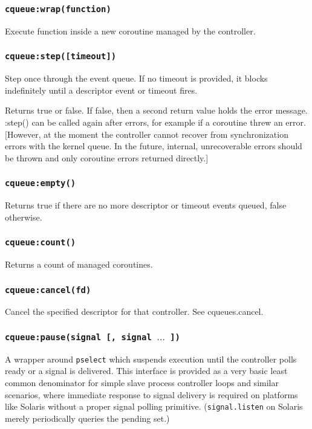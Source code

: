 \documentclass[11pt, oneside]{memoir}
\newcommand*{\syscall}[1]{\texttt{#1}\xspace}
\newcommand*{\routine}[1]{\texttt{#1}\xspace}
\begin{document}
\subsubsection[\routine{cqueues:wrap}]{\routine{cqueue:wrap(function)}}
        Execute function inside a new coroutine managed by the controller.

\subsubsection[\routine{cqueues:step}]{\routine{cqueue:step([timeout])}}
Step once through the event queue. If no timeout is provided, it blocks indefinitely until a descriptor event or timeout fires.

Returns true or false. If false, then a second return value holds the error message. :step() can be called again after errors, for example if a coroutine threw an error. [However, at the moment the controller cannot recover from synchronization errors with the kernel queue. In the future, internal, unrecoverable errors should be thrown and only coroutine errors returned directly.]

\subsubsection[\routine{cqueues:empty}]{\routine{cqueue:empty()}}
Returns true if there are no more descriptor or timeout events queued, false otherwise.

\subsubsection[\routine{cqueues:count}]{\routine{cqueue:count()}}
Returns a count of managed coroutines.

\subsubsection[\routine{cqueues:cancel}]{\routine{cqueue:cancel(fd)}}
Cancel the specified descriptor for that controller. See cqueues.cancel.

\subsubsection[\routine{cqueues:pause}]{\routine{cqueue:pause(signal [, signal $\ldots$ ])}}
A wrapper around \syscall{pselect} which suspends execution until the controller polls ready or a signal is delivered. This interface is provided as a very basic least common denominator for simple slave process controller loops and similar scenarios, where immediate response to signal delivery is required on platforms like Solaris without a proper signal polling primitive. (\routine{signal.listen} on Solaris merely periodically queries the pending set.)
\end{document}
